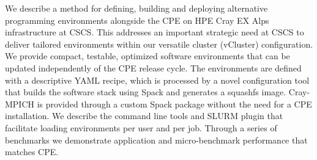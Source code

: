 We describe a method for defining, building and deploying alternative programming environments alongside the CPE on HPE Cray EX Alps infrastructure at CSCS.
This addresses an important strategic need at CSCS to deliver tailored environments within our versatile cluster (vCluster) configuration.
We provide compact, testable, optimized software environments that can be updated independently of the CPE release cycle.
The environments are defined with a descriptive YAML recipe, which is processed by a novel configuration tool that builds the software stack using Spack and generates a squashfs image.
Cray-MPICH is provided through a custom Spack package without the need for a CPE installation.
We describe the command line tools and SLURM plugin that facilitate loading environments per user and per job.
Through a series of benchmarks we demonstrate application and micro-benchmark performance that matches CPE.

